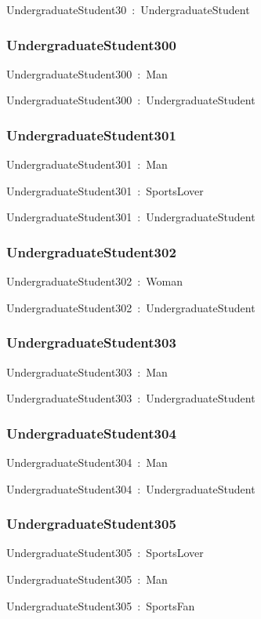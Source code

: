 \documentclass{article}
\begin{document}
UndergraduateStudent30~:~UndergraduateStudent

\subsubsection*{UndergraduateStudent300}

UndergraduateStudent300~:~Man

UndergraduateStudent300~:~UndergraduateStudent

\subsubsection*{UndergraduateStudent301}

UndergraduateStudent301~:~Man

UndergraduateStudent301~:~SportsLover

UndergraduateStudent301~:~UndergraduateStudent

\subsubsection*{UndergraduateStudent302}

UndergraduateStudent302~:~Woman

UndergraduateStudent302~:~UndergraduateStudent

\subsubsection*{UndergraduateStudent303}

UndergraduateStudent303~:~Man

UndergraduateStudent303~:~UndergraduateStudent

\subsubsection*{UndergraduateStudent304}

UndergraduateStudent304~:~Man

UndergraduateStudent304~:~UndergraduateStudent

\subsubsection*{UndergraduateStudent305}

UndergraduateStudent305~:~SportsLover

UndergraduateStudent305~:~Man

UndergraduateStudent305~:~SportsFan
\end{document}
